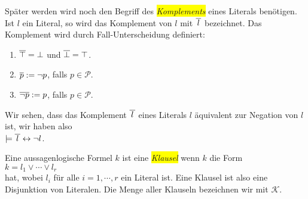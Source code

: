 Sp\"{a}ter werden wird noch den Begriff des \colorbox{yellow}{\emph{Komplements}} eines Literals ben\"{o}tigen.
Ist $l$ ein Literal, so wird das Komplement von $l$ mit $\overline{\,l\,}$
bezeichnet.  Das Komplement wird durch Fall-Unterscheidung definiert:
\begin{enumerate}
\item $\overline{\top} = \bot$ \quad und \quad $\overline{\bot} = \top$. 
\item $\overline{p} := \neg p$, \quad falls $p \in \mathcal{P}$.
\item $\overline{\neg p} := p$, \quad falls $p \in \mathcal{P}$.
\end{enumerate}
Wir sehen, dass das Komplement $\overline{\,l\,}$ eines Literals $l$ \"{a}quivalent zur
Negation von $l$ ist, wir haben also
\\[0.2cm]
\hspace*{1.3cm}
$\models \overline{\,l\,} \leftrightarrow \neg l$.

\begin{Definition}[Klausel]
  Eine aussagenlogische Formel $k$ ist eine \colorbox{yellow}{\emph{Klausel}} wenn $k$ die Form \\[0.2cm]
  \hspace*{1.3cm} $k = l_1 \vee \cdots \vee l_r$ \\[0.2cm]
  hat, wobei $l_i$ f\"{u}r alle $i=1,\cdots,r$ ein Literal ist.  Eine Klausel ist also eine
  Disjunktion von Literalen. 
  Die Menge aller Klauseln bezeichnen wir mit $\mathcal{K}$.
  \eox
\end{Definition}

